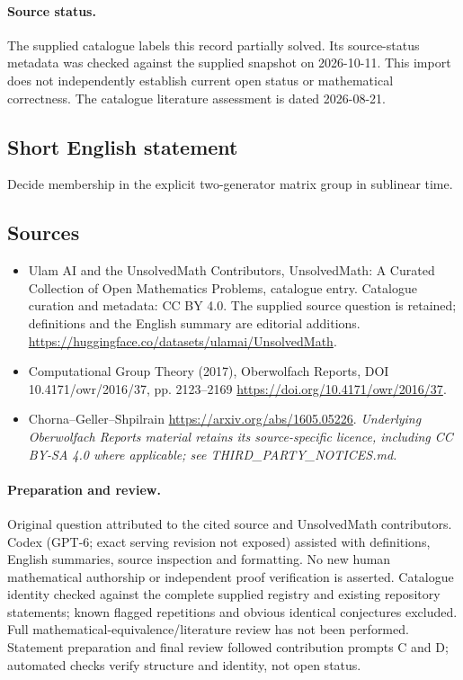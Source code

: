 \documentclass[11pt]{article}
\begin{document}
\paragraph{Source status.}
The supplied catalogue labels this record partially solved. Its source-status metadata was checked against the supplied snapshot on 2026-10-11. This import does not independently establish current open status or mathematical correctness. The catalogue literature assessment is dated 2026-08-21.
\subsection{Short English statement}
Decide membership in the explicit two-generator matrix group in sublinear time.
\subsection{Sources}
\begin{itemize}
\item[\hypertarget{source:statement:1}{S1}] Ulam AI and the UnsolvedMath Contributors, UnsolvedMath: A Curated Collection of Open Mathematics Problems, catalogue entry. Catalogue curation and metadata: CC BY 4.0. The supplied source question is retained; definitions and the English summary are editorial additions.
\url{https://huggingface.co/datasets/ulamai/UnsolvedMath}.
\item[\hypertarget{source:statement:2}{S2}] Computational Group Theory (2017), Oberwolfach Reports, DOI 10.4171/owr/2016/37, pp. 2123--2169
\url{https://doi.org/10.4171/owr/2016/37}.
\item[\hypertarget{source:statement:3}{S3}] Chorna--Geller--Shpilrain
\url{https://arxiv.org/abs/1605.05226}.
\textit{Underlying Oberwolfach Reports material retains its source-specific licence, including CC BY-SA 4.0 where applicable; see THIRD\_PARTY\_NOTICES.md.}
\end{itemize}
\paragraph{Preparation and review.}
Original question attributed to the cited source and UnsolvedMath contributors. Codex (GPT-6; exact serving revision not exposed) assisted with definitions, English summaries, source inspection and formatting. No new human mathematical authorship or independent proof verification is asserted. Catalogue identity checked against the complete supplied registry and existing repository statements; known flagged repetitions and obvious identical conjectures excluded. Full mathematical-equivalence/literature review has not been performed. Statement preparation and final review followed contribution prompts C and D; automated checks verify structure and identity, not open status.
\label{end:statement}
\end{document}
